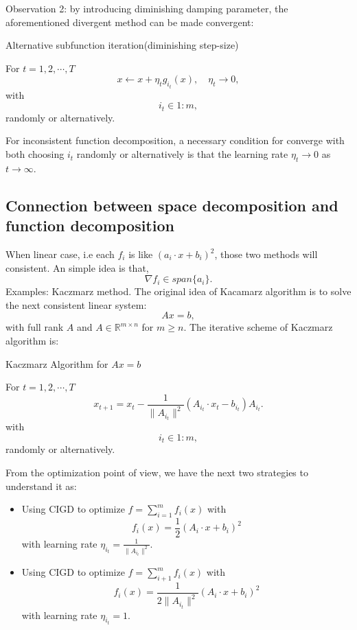 Observation 2:  by introducing diminishing damping parameter, the
aforementioned divergent method can be made convergent:
\begin{algorithm}\caption{Alternative subfunction iteration(diminishing step-size)}\label{CIGD-diminishing}
	For $t = 1,2,\cdots, T$
	$$
	x\leftarrow x+ \eta_t g_{i_t}(x), \quad \eta_t \to 0,
	$$
	with
	$$
	i_t \in 1:m,
	$$
	randomly or alternatively.
\end{algorithm}

\begin{theorem} For inconsistent function decomposition, a necessary
	condition for converge with both choosing $i_t$ randomly or alternatively is that the learning rate
	$\eta_t\to 0$ as $t\to\infty$.
\end{theorem}

\subsection{Connection between space decomposition and function decomposition}
When linear case, i.e each $f_i$ is like $(a_i \cdot x + b_i)^2$, those two methods will consistent. An simple idea is that, 
$$
\nabla f_i \in span\{a_i\}.
$$
Examples:  Kaczmarz method. The original idea of Kacamarz algorithm is to solve the next consistent linear system:
$$
Ax = b,
$$
with full rank $A$ and $A \in \mathbb{R}^{m\times n}$ for $m \ge n$. 
The iterative scheme of Kaczmarz algorithm is:
\begin{algorithm}\caption{Kaczmarz Algorithm for $Ax = b$}\label{algo:Kacamarz}
	For $t = 1,2,\cdots, T$
	\begin{equation}\label{KacamarzAlgo}
	x_{t+1} = x_t -  \frac{1}{\|A_{i_t}\|^2}(A_{i_t} \cdot x_t - b_{i_t})A_{i_t}. 
	\end{equation}
	with
	$$
	i_t \in 1:m,
	$$
	randomly or alternatively.
\end{algorithm}

From the optimization point of view, we have the next two strategies to understand it as:
\begin{itemize}
	\item Using CIGD to optimize $f = \sum_{i=1}^m f_i(x)$ with 
	$$
	f_i(x) = \frac{1}{2}(A_i \cdot x + b_i)^2
	$$
	with learning rate $\eta_{i_t} = \frac{1}{\|A_{i_t}\|^2}$.
	\item Using CIGD to optimize $f = \sum_{i+1}^m f_i(x)$ with 
	$$
	f_i(x) = \frac{1}{2\|A_{i_t}\|^2}(A_i \cdot x + b_i)^2
	$$
	with learning rate $\eta_{i_t} = 1$.
\end{itemize}

